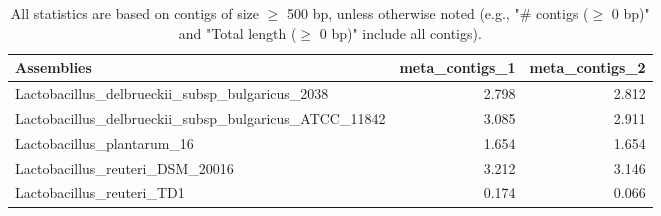 \documentclass[12pt,a4paper]{article}
\begin{document}
\begin{table}[ht]
\begin{center}
\caption{All statistics are based on contigs of size $\geq$ 500 bp, unless otherwise noted (e.g., "\# contigs ($\geq$ 0 bp)" and "Total length ($\geq$ 0 bp)" include all contigs).}
\begin{tabular}{|l*{2}{|r}|}
\hline
Assemblies & meta\_contigs\_1 & meta\_contigs\_2 \\ \hline
Lactobacillus\_delbrueckii\_subsp\_bulgaricus\_2038 & 2.798 & 2.812 \\ \hline
Lactobacillus\_delbrueckii\_subsp\_bulgaricus\_ATCC\_11842 & 3.085 & 2.911 \\ \hline
Lactobacillus\_plantarum\_16 & 1.654 & 1.654 \\ \hline
Lactobacillus\_reuteri\_DSM\_20016 & 3.212 & 3.146 \\ \hline
Lactobacillus\_reuteri\_TD1 & 0.174 & 0.066 \\ \hline
\end{tabular}
\end{center}
\end{table}
\end{document}
